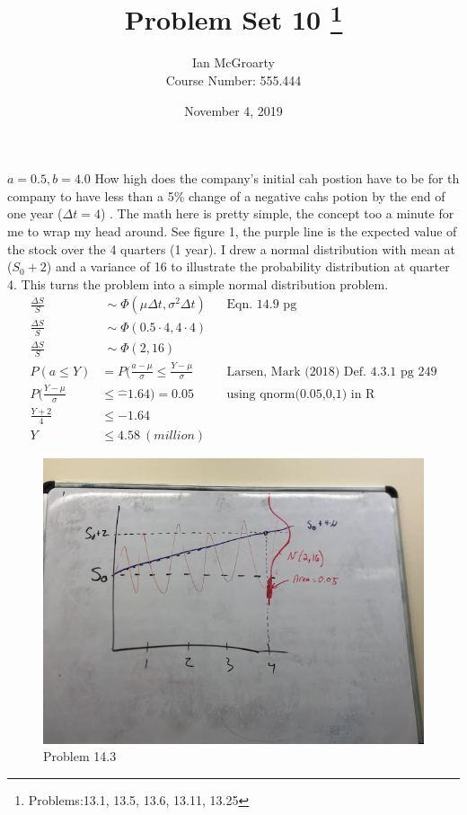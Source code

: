 \documentclass[12pt]{article}
\title{Problem Set 10 \thanks{Problems:13.1, 13.5, 13.6, 13.11, 13.25}}
\author{Ian McGroarty \\
	Course Number: 555.444 \\
}
\date{November 4, 2019}
\newenvironment{problem}[3][Problem]{\begin{trivlist}
\item[\hskip \labelsep {\bfseries #1}\hskip \labelsep {\bfseries #2.}]}{\end{trivlist}}
\begin{document}
\maketitle

\newpage
\begin{problem}{14.3}. $a = 0.5, b = 4.0$ How high does the company\rq{}s initial cah postion have to be for th company to have less than a 5\% change of a negative cahs potion by the end of one year ($\Delta t = 4$) . The math here is pretty simple, the concept too a minute for me to wrap my head around. See figure 1, the purple line is the expected value of the stock over the 4 quarters (1 year). I drew a normal distribution with mean at ($S_0+2$) and a variance of 16 to illustrate the probability distribution at quarter 4. This turns the problem into a simple normal distribution problem. 
\begin{align*}
\frac{\Delta S}{S} & ~\sim \Phi (\mu \Delta t , \sigma^2 \Delta t) && \text{Eqn. 14.9 pg} \\
\frac{\Delta S}{S} & ~\sim \Phi (0.5 \cdot 4 , 4\cdot 4) \\
\frac{\Delta S}{S} & ~\sim \Phi (2, 16) \\
P(a \leq Y) &= P(\frac{a-\mu }{\sigma} \leq \frac{Y- \mu }{\sigma } && \text{Larsen, Mark (2018) Def. 4.3.1 pg 249} \\
P(\frac{Y- \mu }{\sigma } &\leq \hat  -1.64) = 0.05 &&\text{using qnorm(0.05,0,1) in R} \\
\frac{Y+2}{4} &\leq -1.64 \\
Y &\leq 4.58 \ (million)
\end{align*}
\begin{figure}
\includegraphics[width=\linewidth]{mod10_p13.png}
\caption{Problem 14.3}
\end{figure}
\end{problem}
\end{document}
